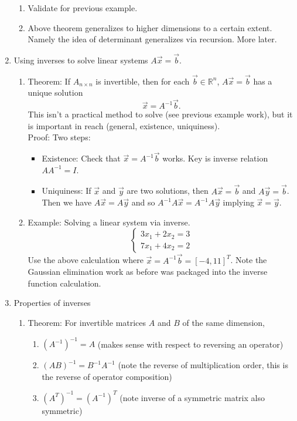 \documentclass{article}
\begin{document}
\begin{enumerate}
\begin{enumerate}
\item Validate for previous example.
 
\item Above theorem generalizes to higher dimensions to a certain extent. Namely the idea of determinant generalizes via recursion. More later.

\end{enumerate}

\item Using inverses to solve linear systems $A\vec{x}=\vec{b}$.
\begin{enumerate}

\item Theorem: If $A_{n \times n}$ is invertible, then for each $\vec{b} \in \mathbb{R}^n$, $A\vec{x} = \vec{b}$ has a unique solution
\[
\vec{x} = A^{-1} \vec{b}.
\]
This isn't a practical method to solve (see previous example work), but it is important in reach (general, existence, uniquiness). \\ 

Proof: Two steps:
\begin{itemize}
\item Existence: Check that $\vec{x} = A^{-1} \vec{b}$ works. Key is inverse relation $A A^{-1} = I$.
\item Uniquiness: If $\vec{x}$ and $\vec{y}$ are two solutions, then $A\vec{x}=\vec{b}$ and $A\vec{y}=\vec{b}$. Then we have $A\vec{x}=A\vec{y}$ and so $A^{-1}A\vec{x} = A^{-1}A\vec{y}$ implying $\vec{x}=\vec{y}$.
\end{itemize}

\item Example: Solving a linear system via inverse.
\[
\begin{cases}
3x_1 + 2x_2 = 3 \\
7x_1+4x_2= 2
\end{cases}
\]
Use the above calculation where $\vec{x} = A^{-1} \vec{b} = [-4, 11]^T$. Note the Gaussian elimination work as before was packaged into the inverse function calculation.

\end{enumerate}


\item Properties of inverses
\begin{enumerate}
\item Theorem: For invertible matrices $A$ and $B$ of the same dimension,
\begin{enumerate}
\item $(A^{-1})^{-1} = A$ (makes sense with respect to reversing an operator)
\item $(AB)^{-1} = B^{-1} A^{-1}$ (note the reverse of multiplication order, this is the reverse of operator composition)
\item $(A^T)^{-1} = (A^{-1})^T$ (note inverse of a symmetric matrix also symmetric)
\end{enumerate}


\end{enumerate}
\end{enumerate}
\end{document}
